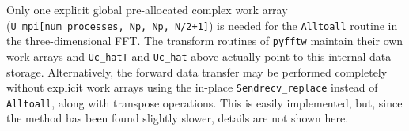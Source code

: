 \documentclass[final,1p,times]{elsarticle}
\newcommand{\inpyth}{\lstinline[style=inlinestyle]} %[]%
\begin{document}
Only one explicit global pre-allocated complex work array (\inpyth{U_mpi[num_processes, Np, Np, N/2+1]}) is needed for the \inpyth{Alltoall} routine in the three-dimensional FFT. The transform routines of \inpyth{pyfftw} maintain their own work arrays and \inpyth{Uc_hatT} and \inpyth{Uc_hat} above actually point to this internal data storage. Alternatively, the forward data transfer may be 
performed completely without explicit work arrays using the in-place \inpyth{Sendrecv_replace} instead of 
\inpyth{Alltoall}, along with transpose operations. This is easily implemented, but, since the method has been found slightly slower, details are not shown here.

\begin{figure}[t!]
\end{figure}
\end{document}
